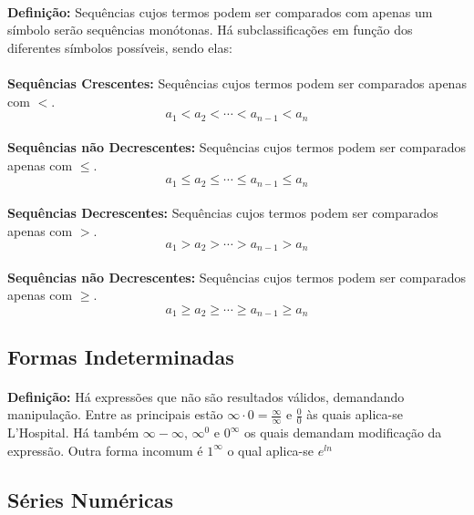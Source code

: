 \documentclass{article}
\begin{document}
\begin{enumerate}[rightmargin = \leftmargin]
        \paragraph{}\textbf{Definição:} Sequências cujos termos podem ser comparados com apenas um símbolo serão sequências monótonas. Há subclassificações em função dos diferentes símbolos possíveis, sendo elas:
        \paragraph{}\textbf{Sequências Crescentes:} Sequências cujos termos podem ser comparados apenas com $<$.
            \[a_1<a_2<\cdots<a_{n-1}<a_n\]
        \paragraph{}\textbf{Sequências não Decrescentes:} Sequências cujos termos podem ser comparados apenas com $\le$.
            \[a_1\le a_2\le \cdots \le a_{n-1} \le a_n\]
        \paragraph{}\textbf{Sequências Decrescentes:} Sequências cujos termos podem ser comparados apenas com $>$.
            \[a_1>a_2>\cdots>a_{n-1}>a_n\]
        \paragraph{}\textbf{Sequências não Decrescentes:} Sequências cujos termos podem ser comparados apenas com $\ge$.
            \[a_1\ge a_2\ge \cdots \ge a_{n-1} \ge a_n\]
            
    \subsection{Formas Indeterminadas}
        \paragraph{}\textbf{Definição:} Há expressões que não são resultados válidos, demandando manipulação. Entre as principais estão $\infty\cdot0=\frac{\infty}{\infty}$ e $\frac{0}{0}$ às quais aplica-se L'Hospital. Há também $\infty-\infty$, $\infty^0$ e $0^{\infty}$ os quais demandam modificação da expressão. Outra forma incomum é $1^{\infty}$ o qual aplica-se $e^{ln}$
    
    \subsection{Séries Numéricas}

\end{enumerate}
\end{document}
